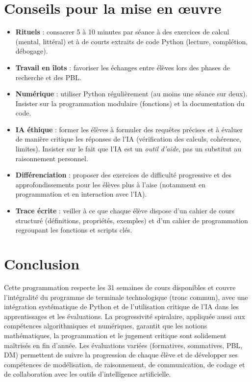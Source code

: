 \documentclass[a4paper,12pt]{article}
\begin{document}
	\section{Conseils pour la mise en œuvre}
	\begin{itemize}
		\item \textbf{Rituels} : consacrer 5 à 10 minutes par séance à des exercices de calcul (mental, littéral) et à de courts extraits de code Python (lecture, complétion, débogage).
		\item \textbf{Travail en îlots} : favoriser les échanges entre élèves lors des phases de recherche et des PBL.
		\item \textbf{Numérique} : utiliser Python régulièrement (au moins une séance sur deux). Insister sur la programmation modulaire (fonctions) et la documentation du code.
		\item \textbf{IA éthique} : former les élèves à formuler des requêtes précises et à évaluer de manière critique les réponses de l’IA (vérification des calculs, cohérence, limites). Insister sur le fait que l’IA est un \emph{outil d’aide}, pas un substitut au raisonnement personnel.
		\item \textbf{Différenciation} : proposer des exercices de difficulté progressive et des approfondissements pour les élèves plus à l’aise (notamment en programmation et en interaction avec l’IA).
		\item \textbf{Trace écrite} : veiller à ce que chaque élève dispose d’un cahier de cours structuré (définitions, propriétés, exemples) et d’un cahier de programmation regroupant les fonctions et scripts clés.
	\end{itemize}
	
	\section*{Conclusion}
	Cette programmation respecte les 31 semaines de cours disponibles et couvre l’intégralité du programme de terminale technologique (tronc commun), avec une intégration systématique de Python et de l’utilisation critique de l’IA dans les apprentissages et les évaluations. La progressivité spiralaire, appliquée aussi aux compétences algorithmiques et numériques, garantit que les notions mathématiques, la programmation et le jugement critique sont solidement maîtrisés en fin d’année. Les évaluations variées (formatives, sommatives, PBL, DM) permettent de suivre la progression de chaque élève et de développer ses compétences de modélisation, de raisonnement, de communication, de codage et de collaboration avec les outils d’intelligence artificielle.
	
\end{document}
